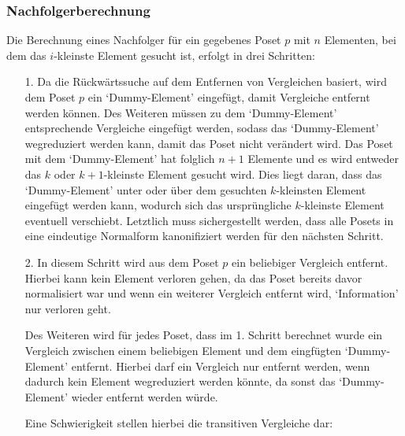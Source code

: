\documentclass[10pt,journal,compsoc]{IEEEtran}
\begin{document}
\subsubsection{Nachfolgerberechnung}
Die Berechnung eines Nachfolger für ein gegebenes Poset $p$ mit $n$ Elementen, bei dem das $i$-kleinste Element gesucht ist, erfolgt in drei Schritten:



\begin{itemize}
  \item[1.]
    Da die Rückwärtssuche auf dem Entfernen von Vergleichen basiert, wird dem Poset $p$ ein `Dummy-Element' eingefügt, damit Vergleiche entfernt werden können.
    Des Weiteren müssen zu dem `Dummy-Element' entsprechende Vergleiche eingefügt werden, sodass das `Dummy-Element' wegreduziert werden kann, damit das Poset nicht verändert wird.
    Das Poset mit dem `Dummy-Element' hat folglich $n + 1$ Elemente und es wird entweder das $k$ oder $k + 1$-kleinste Element gesucht wird.
    Dies liegt daran, dass das `Dummy-Element' unter oder über dem gesuchten $k$-kleinsten Element eingefügt werden kann, wodurch sich das ursprüngliche $k$-kleinste Element eventuell verschiebt.
    Letztlich muss sichergestellt werden, dass alle Posets in eine eindeutige Normalform kanonifiziert werden für den nächsten Schritt.

  \item[2.]
    In diesem Schritt wird aus dem Poset $p$ ein beliebiger Vergleich entfernt.
    Hierbei kann kein Element verloren gehen, da das Poset bereits davor normalisiert war und wenn ein weiterer Vergleich entfernt wird, `Information' nur verloren geht. %

    Des Weiteren wird für jedes Poset, dass im 1. Schritt berechnet wurde ein Vergleich zwischen einem beliebigen Element und dem eingfügten `Dummy-Element' entfernt.
    Hierbei darf ein Vergleich nur entfernt werden, wenn dadurch kein Element wegreduziert werden könnte, da sonst das `Dummy-Element' wieder entfernt werden würde.

    Eine Schwierigkeit stellen hierbei die transitiven Vergleiche dar: \\
    \begin{figure}
\end{figure}
\end{itemize}
\end{document}
